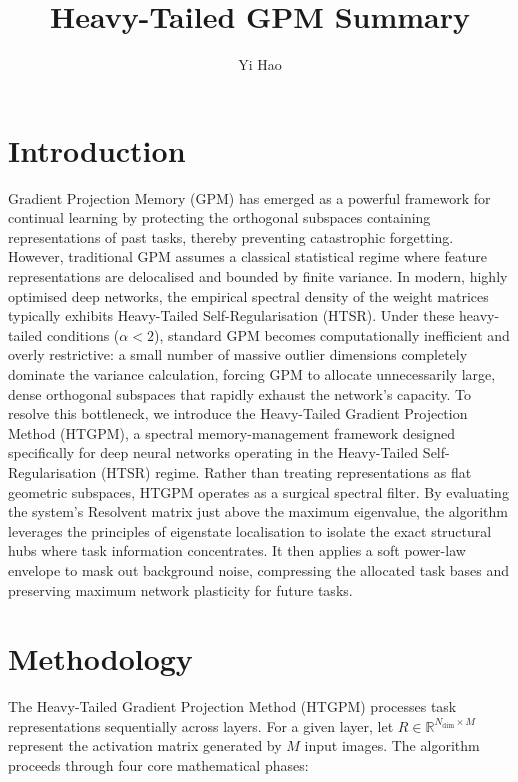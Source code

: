 \documentclass[10pt,a4paper]{article}
\title{\vspace*{-1cm}Heavy-Tailed GPM Summary}
\author{Yi Hao}
\begin{document}
	\maketitle
	\section{Introduction}
	
	Gradient Projection Memory (GPM) has emerged as a powerful framework for continual learning by protecting the orthogonal subspaces containing representations of past tasks, thereby preventing catastrophic forgetting. However, traditional GPM assumes a classical statistical regime where feature representations are delocalised and bounded by finite variance. In modern, highly optimised deep networks, the empirical spectral density of the weight matrices typically exhibits Heavy-Tailed Self-Regularisation (HTSR). Under these heavy-tailed conditions ($\alpha < 2$), standard GPM becomes computationally inefficient and overly restrictive: a small number of massive outlier dimensions completely dominate the variance calculation, forcing GPM to allocate unnecessarily large, dense orthogonal subspaces that rapidly exhaust the network's capacity. To resolve this bottleneck, we introduce the Heavy-Tailed Gradient Projection Method (HTGPM), a spectral memory-management framework designed specifically for deep neural networks operating in the Heavy-Tailed Self-Regularisation (HTSR) regime. Rather than treating representations as flat geometric subspaces, HTGPM operates as a surgical spectral filter. By evaluating the system's Resolvent matrix just above the maximum eigenvalue, the algorithm leverages the principles of eigenstate localisation to isolate the exact structural hubs where task information concentrates. It then applies a soft power-law envelope to mask out background noise, compressing the allocated task bases and preserving maximum network plasticity for future tasks.
	
	\section{Methodology}
	
	The Heavy-Tailed Gradient Projection Method (HTGPM) processes task representations sequentially across layers. For a given layer, let $R \in \mathbb{R}^{N_{\text{dim}} \times M}$ represent the activation matrix generated by $M$ input images. The algorithm proceeds through four core mathematical phases:
	
\end{document}
